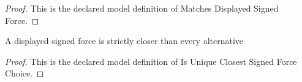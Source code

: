 \begin{proof}
  This is the declared model definition of Matches Displayed Signed Force.
\end{proof}
\begin{definition}
  \label{def:physics:phyx-mini-0950:phyxminiproblems-problemphyxmini0950-isuniqueclosestsignedforcechoice}
  A displayed signed force is strictly closer than every alternative
\end{definition}
\begin{proof}
  This is the declared model definition of Is Unique Closest Signed Force Choice.
\end{proof}

